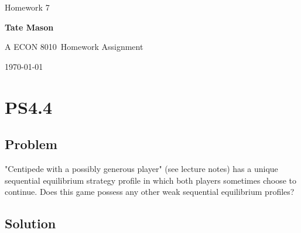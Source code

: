 \documentclass[10pt, a4paper]{article}
\newcommand\course{ECON 8010}                            %
\newcommand\hwnumber{7}                                  %
\newcommand\Information{Tate Mason}                        %
\begin{document}
  \begin{titlepage}
    \begin{center}
      \vspace*{3cm}
            
        \vspace{1cm}
        \huge
        Homework \hwnumber
            
        \vspace{1.5cm}
        \Large
            
        \textbf{\Information}                      %
            
        \vfill
        
        A \course \ Homework Assignment
            
        \vspace{1cm}
        \Large

        
        \today
            
    \end{center}
  \end{titlepage}

  \newpage
  \section*{PS4.4}
    \subsection*{Problem}
      "Centipede with a possibly generous player" (see lecture notes) has a unique sequential equilibrium strategy profile in which both players sometimes choose to continue. Does this game possess any other weak sequential equilibrium profiles?
    \subsection*{Solution}
\end{document}
